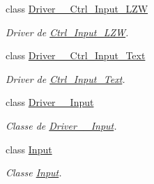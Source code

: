 \begin{DoxyCompactItemize}
class \hyperlink{classpersistencia_1_1input_1_1Driver____Ctrl__Input__LZW}{Driver\+\_\+\+\_\+\+Ctrl\+\_\+\+Input\+\_\+\+L\+ZW}
\begin{DoxyCompactList}\small\item\em Driver de \hyperlink{classpersistencia_1_1input_1_1Ctrl__Input__LZW}{Ctrl\+\_\+\+Input\+\_\+\+L\+ZW}. \end{DoxyCompactList}\item 
class \hyperlink{classpersistencia_1_1input_1_1Driver____Ctrl__Input__Text}{Driver\+\_\+\+\_\+\+Ctrl\+\_\+\+Input\+\_\+\+Text}
\begin{DoxyCompactList}\small\item\em Driver de \hyperlink{classpersistencia_1_1input_1_1Ctrl__Input__Text}{Ctrl\+\_\+\+Input\+\_\+\+Text}. \end{DoxyCompactList}\item 
class \hyperlink{classpersistencia_1_1input_1_1Driver____Input}{Driver\+\_\+\+\_\+\+Input}
\begin{DoxyCompactList}\small\item\em Classe de \hyperlink{classpersistencia_1_1input_1_1Driver____Input}{Driver\+\_\+\+\_\+\+Input}. \end{DoxyCompactList}\item 
class \hyperlink{classpersistencia_1_1input_1_1Input}{Input}
\begin{DoxyCompactList}\small\item\em Classe \hyperlink{classpersistencia_1_1input_1_1Input}{Input}. \end{DoxyCompactList}\end{DoxyCompactItemize}
